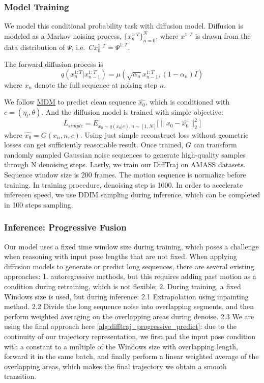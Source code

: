 \documentclass{article}
\begin{document}
\subsubsection{Model Training}\label{model-training}

We model this conditional probability task with diffusion model. Diffusion is modeled as a Markov noising process, ${\{x^{1:T}_n\}_{n=0}^N}$, where $x^{1:T}$ is drawn from the data distribution of $\Psi$, i.e.~$Cx^{1:T}_0=\Psi^{1:T}$.

The forward diffusion process is \[
q(x_{n}^{1:T}|x_{n-1}^{1:T}) = \mu(\sqrt{\alpha_n}x_{n-1}^{1:T}, (1-\alpha_n)I)
\] where $x_{n}$ denote the full sequence at noising step $n$.

We follow \href{https://github.com/GuyTevet/motion-diffusion-model}{MDM} to predict clean sequence $\hat{x_0}$, which is conditioned with $c=(\eta_t,\theta)$. And the diffusion model is trained with simple objective: \[
L_{simple} = E_{x_0 \sim q(x_0|c),n \sim [1,N]} \big[\big\|x_0-\hat{x_0}\big\|^2_2\big]
\] where $\hat{x_0} = G(x_n,n,c)$. Using just simple reconstruct loss without geometric losses can get sufficiently reasonable result. Once trained, $G$ can transform randomly sampled Gaussian noise sequences to generate high-quality samples through N denoising steps. Lastly, we train our DiffTraj on AMASS datasets. Sequence window size is 200 frames. The motion sequence is normalize before training. In training procedure, denoising step is 1000. In order to accelerate inferecen speed, we use DDIM sampling during inference, which can be completed in 100 steps sampling.

\subsubsection{Inference: Progressive Fusion}\label{progressive-inference}

Our model uses a fixed time window size during training, which poses a challenge when reasoning with input pose lengths that are not fixed. When applying diffusion models to generate or predict long sequences, there are several existing approaches: 1. autoregressive methods, but this requires adding past motion as a condition during retraining, which is not flexible; 2. During training, a fixed Windows size is used, but during inference: 2.1 Extrapolation using inpainting method. 2.2 Divide the long sequence noise into overlapping segments, and then perform weighted averaging on the overlapping areas during denoise. 2.3 We are using the final approach here \ref{alg:difftraj_progressive_predict}: due to the continuity of our trajectory representation, we first pad the input pose condition with a constant to a multiple of the Windows size with overlapping length, forward it in the same batch, and finally perform a linear weighted average of the overlapping areas, which makes the final trajectory we obtain a smooth transition.
\end{document}
